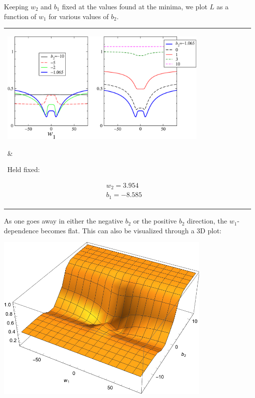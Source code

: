 \documentclass[12pt,a4paper]{article}
\begin{document}
Keeping $w_2$ and $b_1$ fixed at the values found at the minima, we plot $L$ as a function of $w_1$
for various values of $b_2$.  


\smallskip


\begin{center}
\begin{tabular}{ll}
%
\parbox{0.82\textwidth}{ 
%

\begin{flushleft}
\includegraphics[width=0.81\textwidth]{Images/3node_largedomain_fitness_vs_w1_varyb2_a_01.pdf}
\end{flushleft}


} &   \hspace{-0.01\textwidth}
\parbox{0.16\textwidth}{ \centering

Held fixed: 

\begin{gather*}
  w_2 = 3.954
  \\
  b_1 = -8.585
\end{gather*}


} 
\\
\end{tabular}
\end{center}


As one goes away in either the negative $b_2$ or the positive $b_2$ direction, the $w_1$-dependence
becomes flat.   This can also be visualized through a 3D plot:

\smallskip

\begin{center}
\includegraphics[width=0.79\textwidth]{Images/3node_largedomain_fitness_vs_w1_b2_3dplot.pdf}
\end{center}
\end{document}
